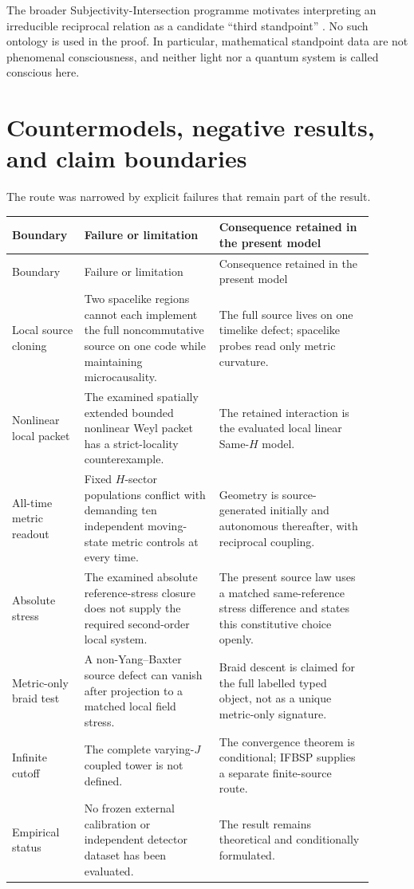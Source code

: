 \documentclass[11pt]{article}
\theoremstyle{definition}
\theoremstyle{remark}
\begin{document}
The broader Subjectivity-Intersection programme motivates interpreting an irreducible reciprocal relation as a candidate ``third standpoint'' \cite{watanabe2026ontology,watanabe2026sim}. No such ontology is used in the proof. In particular, mathematical standpoint data are not phenomenal consciousness, and neither light nor a quantum system is called conscious here.

\section{Countermodels, negative results, and claim boundaries}

The route was narrowed by explicit failures that remain part of the result.

\begin{longtable}{>{\raggedright\arraybackslash}p{0.17\linewidth}>{\raggedright\arraybackslash}p{0.34\linewidth}>{\raggedright\arraybackslash}p{0.39\linewidth}}
\toprule
Boundary & Failure or limitation & Consequence retained in the present model\\
\midrule
\endfirsthead
\toprule
Boundary & Failure or limitation & Consequence retained in the present model\\
\midrule
\endhead
Local source cloning & Two spacelike regions cannot each implement the full noncommutative source on one code while maintaining microcausality. & The full source lives on one timelike defect; spacelike probes read only metric curvature.\\
Nonlinear local packet & The examined spatially extended bounded nonlinear Weyl packet has a strict-locality counterexample. & The retained interaction is the evaluated local linear Same-$H$ model.\\
All-time metric readout & Fixed $H$-sector populations conflict with demanding ten independent moving-state metric controls at every time. & Geometry is source-generated initially and autonomous thereafter, with reciprocal coupling.\\
Absolute stress & The examined absolute reference-stress closure does not supply the required second-order local system. & The present source law uses a matched same-reference stress difference and states this constitutive choice openly.\\
Metric-only braid test & A non-Yang--Baxter source defect can vanish after projection to a matched local field stress. & Braid descent is claimed for the full labelled typed object, not as a unique metric-only signature.\\
Infinite cutoff & The complete varying-$J$ coupled tower is not defined. & The convergence theorem is conditional; IFBSP supplies a separate finite-source route.\\
Empirical status & No frozen external calibration or independent detector dataset has been evaluated. & The result remains theoretical and conditionally formulated.\\
\bottomrule
\end{longtable}
\end{document}
